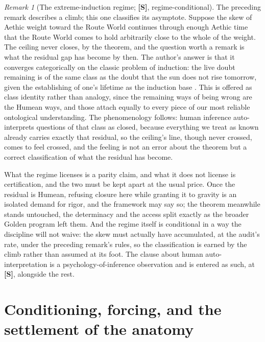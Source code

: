 \documentclass[11pt]{article}
\theoremstyle{plain}
\theoremstyle{definition}
\theoremstyle{remark}
\newtheorem{remark}[theorem]{Remark}
\begin{document}
\begin{remark}[The extreme-induction regime; \textbf{[S]}, regime-conditional]\label{sch:rem:inductionregime}
The preceding remark describes a climb; this one classifies its
asymptote. Suppose the skew of Aethic weight toward the Route World
continues through enough Aethic time that the Route World comes to
hold arbitrarily close to the whole of the weight. The ceiling never
closes, by the theorem, and the question worth a remark is what the
residual gap has become by then. The author's answer is that it
converges categorically on the classic problem of induction: the
live doubt remaining is of the same class as the doubt that the sun
does not rise tomorrow, given the establishing of one's lifetime as
the induction base \cite{Hume1748}. This is offered as class
identity rather than analogy, since the remaining ways of being
wrong are the Humean ways, and those attach equally to every piece
of our most reliable ontological understanding. The phenomenology
follows: human inference auto-interprets questions of that class as
closed, because everything we treat as known already carries exactly
that residual, so the ceiling's line, though never crossed, comes to
feel crossed, and the feeling is not an error about the theorem but
a correct classification of what the residual has become.

What the regime licenses is a parity claim, and what it does not
license is certification, and the two must be kept apart at the
usual price. Once the residual is Humean, refusing closure here
while granting it to gravity is an isolated demand for rigor, and
the framework may say so; the theorem meanwhile stands untouched,
the determinacy and the access split exactly as
the broader Golden program left them. And the regime itself is
conditional in a way the discipline will not waive: the skew must
actually have accumulated, at the audit's rate, under the preceding
remark's rules, so the classification is earned by the climb rather
than assumed at its foot. The clause about human auto-interpretation
is a psychology-of-inference observation and is entered as such, at
\textbf{[S]}, alongside the rest.
\end{remark}


\section{Conditioning, forcing, and the settlement of the anatomy}\label{sec:forcing}
\end{document}
